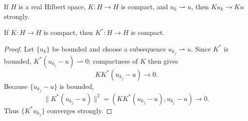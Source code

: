 \begin{remark}
\label{rem:compact-operator-weak-to-strong-convergence}

If $H$ is a real Hilbert space, $K:H\to H$ is compact, and $u_k\rightharpoonup u$, then $Ku_k\to Ku$ strongly.
\end{remark}

\begin{theorem}
\label{thm:compactness-of-adjoint-operator}

If $K:H\to H$ is compact, then $K^*:H\to H$ is compact.
\end{theorem}
\begin{proof}
\sketch Let $\{u_k\}$ be bounded and choose a subsequence $u_{k_j}\rightharpoonup u$. Since $K^*$ is bounded, $K^*(u_{k_j}-u)\rightharpoonup0$; compactness of $K$ then gives
\[
KK^*(u_{k_j}-u)\to0.
\]
Because $\{u_{k_j}-u\}$ is bounded,
\[
\|K^*(u_{k_j}-u)\|^2
=(KK^*(u_{k_j}-u),u_{k_j}-u)\to0.
\]
Thus $\{K^*u_{k_j}\}$ converges strongly.
\end{proof}

